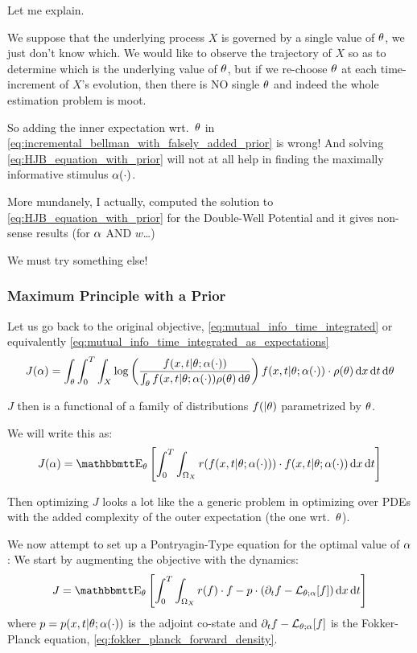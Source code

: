 \documentclass{article}
\begin{document}
Let me explain.

We suppose that the underlying process $X$ is governed by a single value of
${\theta}$, we just don't know which. We would like to observe the
trajectory of $X$ so as to determine which is the underlying value of ${\theta}$, but
if we re-choose ${\theta}$ at each time-increment of $X$'s evolution, then there is
NO single ${\theta}$ and indeed the whole estimation problem is moot.

So adding the inner expectation wrt.\ ${\theta}$ in
\cref{eq:incremental_bellman_with_falsely_added_prior} is wrong! And solving
\cref{eq:HJB_equation_with_prior} will not at all help in finding the maximally
informative stimulus ${\alpha}(\cdot)$.

More mundanely, I actually, computed the solution to
\cref{eq:HJB_equation_with_prior} for the Double-Well Potential and it gives
non-sense results (for ${\alpha}$ AND $w$\ldots)

We must try something else!


\subsubsection{Maximum Principle with a Prior}
\label{sec:MP_with_a_prior}
Let us go back to the original objective,
\cref{eq:mutual_info_time_integrated} or equivalently
\cref{eq:mutual_info_time_integrated_as_expectations}
$$
J({\alpha})  = \int_{\theta} \int_0^T\int_X
 \log\left(\frac{f(x,t|{\theta} ; {\alpha}(\cdot) )}
 			{\int_{\theta} f(x,t|{\theta}; {\alpha}(\cdot)) \rho({\theta})\, \mathrm{d} {\theta}}\right) 
 f(x,t|{\theta}; {\alpha}(\cdot)) \cdot \rho({\theta}) \, \mathrm{d} x\, \mathrm{d} t\, \mathrm{d} {\theta}
$$

$J$ then is a functional of a family of distributions $f(|{\theta})$ parametrized by
${\theta}$.

We will write this as:
$$
J(\a)  = \Exp_\th \left[ \int_0^T\int_{\O_X}
r(f(x,t|\th; \a(\cdot))) \cdot   
 f(x,t|\th; \a(\cdot)) \intd{x}\intd{t} \right]
$$ 

Then optimizing $J$ looks a lot like the a generic problem in optimizing over
PDEs with the added complexity of the outer expectation (the one wrt.\ ${\theta}$).

We now attempt to set up a Pontryagin-Type equation for the optimal value of
${\alpha}$: We start by augmenting the objective with the dynamics:
\begin{equation}
J =  \Exp_\th
\left[ \int_0^T\int_{\O_X} r(f) \cdot f - p \cdot (\di_t f - \L_{\th;\a}[f])
\intd{x}\intd{t}\right] 
\label{eq:objective_augmented}
\end{equation} 
where $p =  p(x,t|{\theta}; {\alpha}(\cdot))$ is the adjoint co-state and ${\partial}_t f -
{ \mathcal{L} }_{{\theta};{\alpha}}[f]$ is the Fokker-Planck equation,
\cref{eq:fokker_planck_forward_density}.
\end{document}
